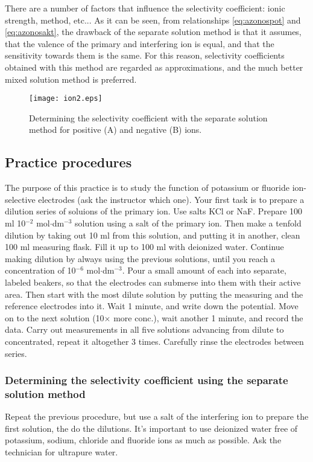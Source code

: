 There are a number of factors that influence the selectivity coefficient: ionic strength, method, etc...
As it can be seen, from relationships \ref{eq:azonospot} and \ref{eq:azonosakt}, the drawback of the separate solution method is that it assumes, that the valence of the primary and interfering ion is equal, and that the sensitivity towards them is the same.
For this reason, selectivity coefficients obtained with this method are regarded as approximations, and the much better mixed solution method is preferred.

\begin{figure}
\centering
\texttt{[image: ion2.eps]}
\caption{Determining the selectivity coefficient with the separate solution method for positive (A) and negative (B) ions.}
\label{fig:ion2}
\end{figure}

\subsection{Practice procedures}
The purpose of this practice is to study the function of potassium or fluoride ion-selective electrodes (ask the instructor which one).
Your first task is to prepare a dilution series of soluions of the primary ion. Use salts KCl or NaF.
Prepare 100 ml 10$^{-2}$ mol$\cdot$dm$^{-3}$ solution using a salt of the primary ion. 
Then make a tenfold dilution by taking out 10 ml from this solution, and putting it in another, clean 100 ml measuring flask. Fill it up to 100 ml with deionized water. Continue making dilution by always using the previous solutions, until you reach a concentration of 10$^{-6}$ mol$\cdot$dm$^{-3}$. 
Pour a small amount of each into separate, labeled beakers, so that the electrodes can submerse into them with their active area.
Then start with the most dilute solution by putting the measuring and the reference electrodes into it. Wait 1 minute, and write down the potential.
Move on to the next solution (10$\times$ more conc.), wait another 1 minute, and record the data.
Carry out measurements in all five solutions advancing from dilute to concentrated, repeat it altogether 3 times. Carefully rinse the electrodes between series.

\subsubsection{Determining the selectivity coefficient using the separate solution method}
Repeat the previous procedure, but use a salt of the interfering ion to prepare the first solution, the do the dilutions. It's important to use deionized water free of potassium, sodium, chloride and fluoride ions as much as possible. Ask the technician for ultrapure water. 

